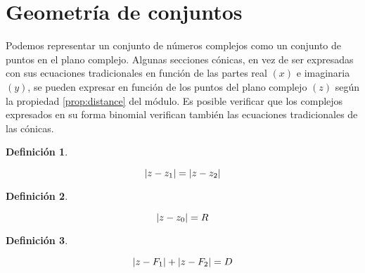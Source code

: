 \documentclass[a5paper,12pt,twoside]{book}
\newtheorem{defn}{{Definición}}[chapter]
\begin{document}
\section{Geometría de conjuntos}

Podemos representar un conjunto de números complejos como un conjunto de puntos en el plano complejo. Algunas secciones cónicas, en vez de ser expresadas con sus ecuaciones tradicionales en función de las partes real $(x)$ e imaginaria $(y)$, se pueden expresar en función de los puntos del plano complejo $(z)$ según la propiedad \ref{prop:distance} del módulo. Es posible verificar que los complejos expresados en su forma binomial verifican también las ecuaciones tradicionales de las cónicas.

\begin{mdframed}[style=MyFrame1]
    \begin{defn}
    \end{defn}
    \begin{equation*}
        {\left| {z-z_1} \right|} = {\left| {z-z_2} \right|}
    \end{equation*}
\end{mdframed}

\begin{center}
    \def\svgwidth{0.6\linewidth}
    
\end{center}

\begin{mdframed}[style=MyFrame1]
    \begin{defn}
    \end{defn}
    \begin{equation*}
        {\left| {z-z_0} \right|} = R
    \end{equation*}
\end{mdframed}

\begin{center}
    \def\svgwidth{0.6\linewidth}
    
\end{center}

\begin{mdframed}[style=MyFrame1]
    \begin{defn}
    \end{defn}
    \begin{equation*}
        {\left| {z-F_1} \right|} + {\left| {z-F_2} \right|} = D
    \end{equation*}
\end{mdframed}
\end{document}
